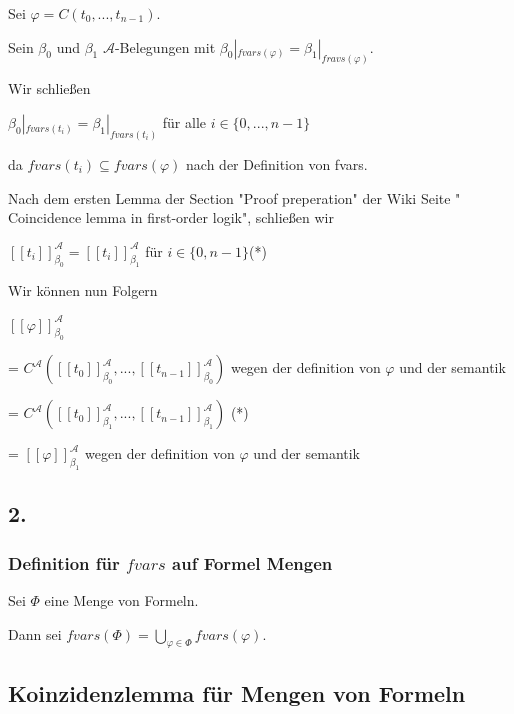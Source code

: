Sei $\varphi = C(t_0,...,t_{n-1})$.

Sein $\beta_0$ und $\beta_1$ $\mathcal{A}$-Belegungen mit $\beta_0|_{fvars(\varphi)} = \beta_1|_{fravs(\varphi)}$.

\hfill

Wir schließen

 $\beta_0|_{fvars(t_i)} = \beta_1|_{fvars(t_i)}$ für alle $i \in \{0,...,n-1\}$ 
 
 da $fvars(t_i) \subseteq fvars(\varphi)$ nach der Definition von fvars.
 
\hfill

Nach dem ersten Lemma der Section "Proof preperation" der Wiki Seite " Coincidence lemma in first-order logik",
schließen wir 

$[\![ t_i ]\!]_{\beta_0}^\mathcal{A} = [\![ t_i ]\!]_{\beta_1}^\mathcal{A}$ für $i \in \{0,n-1\}$(*)

\hfill

Wir können nun Folgern

$[\![\varphi]\!]_{\beta_0}^\mathcal{A}$ 

=  $C^{\mathcal{A}}([\![ t_0 ]\!]_{\beta_0}^\mathcal{A},...,[\![ t_{n-1} ]\!]_{\beta_0}^\mathcal{A})$ wegen der definition von $\varphi$ und der semantik

=  $C^{\mathcal{A}}([\![ t_0 ]\!]_{\beta_1}^\mathcal{A},...,[\![ t_{n-1} ]\!]_{\beta_1}^\mathcal{A})$ (*)

= $[\![\varphi]\!]_{\beta_1}^\mathcal{A}$ wegen der definition von $\varphi$ und der semantik




\subsection*{2.}

\subsubsection*{Definition für $fvars$ auf Formel Mengen}

Sei $\Phi$ eine Menge von Formeln.

Dann sei $fvars(\Phi) = \bigcup\limits_{\varphi \in \Phi} fvars(\varphi)$.

\subsection*{Koinzidenzlemma für Mengen von Formeln}

